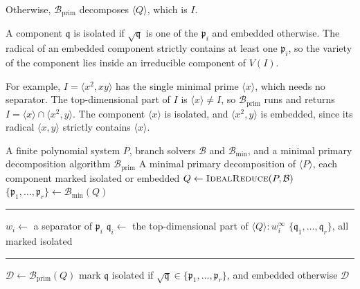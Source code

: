 Otherwise, $\mathcal B_{\mathrm{prim}}$ decomposes $\langle Q\rangle$, which
is $I$.

A component $\mathfrak q$ is isolated if $\sqrt{\mathfrak q}$ is one of the
$\mathfrak p_i$ and embedded otherwise. The radical of an embedded component
strictly contains at least one $\mathfrak p_i$, so the variety of the component
lies inside an irreducible component of $V(I)$.

For example, $I=\langle x^2,xy\rangle$ has the single minimal prime
$\langle x\rangle$, which needs no separator. The top-dimensional part of $I$
is $\langle x\rangle\neq I$, so $\mathcal B_{\mathrm{prim}}$ runs and returns
$I=\langle x\rangle\cap\langle x^2,y\rangle$. The component $\langle x\rangle$
is isolated, and $\langle x^2,y\rangle$ is embedded, since its radical
$\langle x,y\rangle$ strictly contains $\langle x\rangle$.

\begin{algorithm}[htbp]
  \caption{Primary factor branching}
  \label{alg:PrimaryBranching}
  \begin{algorithmic}[1]
    \Require A finite polynomial system $P$, branch solvers $\mathcal B$ and
    $\mathcal B_{\min}$, and a minimal primary decomposition algorithm
    $\mathcal B_{\mathrm{prim}}$
    \Ensure A minimal primary decomposition of $\langle P\rangle$, each
    component marked isolated or embedded
    \State $Q\gets\Call{IdealReduce}{P,\mathcal B}$
    \State $\{\mathfrak p_1,\ldots,\mathfrak p_r\}\gets\mathcal B_{\min}(Q)$
    \par\vskip3pt\hrule\vskip3pt
     
    \State $w_i\gets$ a separator of $\mathfrak p_i$
    \State $\mathfrak q_i\gets$ the top-dimensional part of
    $\langle Q\rangle:w_i^\infty$
    \EndFor
    \State \Return $\{\mathfrak q_1,\ldots,\mathfrak q_r\}$, all marked
    isolated
    \EndIf
    \par\vskip3pt\hrule\vskip3pt
    \State $\mathcal D\gets\mathcal B_{\mathrm{prim}}(Q)$
    \State mark $\mathfrak q$ isolated if
    $\sqrt{\mathfrak q}\in\{\mathfrak p_1,\ldots,\mathfrak p_r\}$,
    and embedded otherwise
    \EndFor
    \State \Return $\mathcal D$
  \end{algorithmic}
\end{algorithm}

